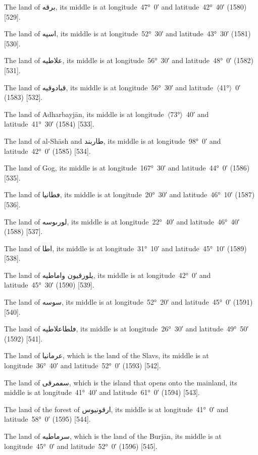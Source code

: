 \documentclass[11pt]{article}
\newcommand{\Pg}[1]{\marginpar{\footnotesize #1}}
\newcommand{\Ang}[1]{\ensuremath{#1}}
\begin{document}
The land of \textarabic{برقه}, its middle is at longitude~47°~0′ and latitude~42°~40′ (1580) [529].

\Pg{p. 104}The land of \textarabic{اسيه}, its middle is at longitude~52°~30′ and latitude~43°~30′ (1581) [530].

The land of \textarabic{علاطيه}, its middle is at longitude~56°~30′ and latitude~48°~0′ (1582) [531].

The land of \textarabic{قبادوقيه}, its middle is at longitude~56°~30′ and latitude~\Ang{\langle}41°\Ang{\rangle}~0′ (1583) [532].

The land of Adharbayjān, its middle is at longitude~\Ang{\langle}73°\Ang{\rangle}~40′ and latitude~41°~30′ (1584) [533].

The land of al-Shāsh and \textarabic{طاربند}, its middle is at longitude~98°~0′ and latitude~42°~0′ (1585) [534].

The land of Gog, its middle is at longitude~167°~30′ and latitude~44°~0′ (1586) [535].

The land of \textarabic{ڡطانيا}, its middle is at longitude~20°~30′ and latitude~46°~10′ (1587) [536].

The land of \textarabic{لورٮوسه}, its middle is at longitude~22°~40′ and latitude~46°~40′ (1588) [537].

The land of \textarabic{اطا}, its middle is at longitude~31°~10′ and latitude~45°~10′ (1589) [538].

The land of \textarabic{يلورقيون واماطيه}, its middle is at longitude~42°~0′ and latitude~45°~30′ (1590) [539].

The land of \textarabic{سوسه}, its middle is at longitude~52°~20′ and latitude~45°~0′ (1591) [540].

The land of \textarabic{ڡلطاعلاطيه}, its middle is at longitude~26°~30′ and latitude~49°~50′ (1592) [541]\Pg{p. 105}.

The land of \textarabic{عرمانيا}, which is the land of the Slavs, its middle is at longitude~36°~40′ and latitude~52°~0′ (1593) [542].

The land of \textarabic{سڡمرقى}, which is the island that opens onto the mainland, its middle is at longitude~41°~40′ and latitude~61°~0′ (1594) [543].

The land of the forest of \textarabic{ارقونيوس}, its middle is at longitude~41°~0′ and latitude~58°~0′ (1595) [544].

The land of \textarabic{سرماطيه}, which is the land of the Burjān, its middle is at longitude~45°~0′ and latitude~52°~0′ (1596) [545].
\end{document}

